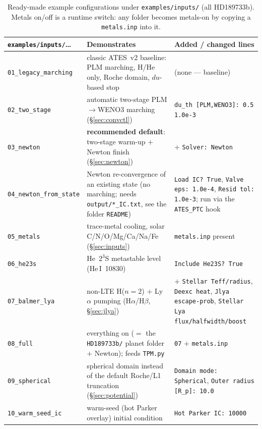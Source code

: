 \documentclass[english,a4paper]{kiseon_memo}
\begin{document}
\begin{table}[htbp]\centering\small
\begin{tabular}{@{}lp{4.6cm}p{5.6cm}@{}}
\toprule
\texttt{examples/inputs/}\ldots & Demonstrates & Added / changed lines \\
\midrule
\texttt{01\_legacy\_marching} & classic ATES~v2 baseline: PLM marching,
  H/He only, Roche domain, $du$-based stop & (none --- baseline) \\
\texttt{02\_two\_stage} & automatic two-stage PLM$\to$WENO3 marching
  (\S\ref{sec:convctl}) & \texttt{du\_th [PLM,WENO3]: 0.5 1.0e-3} \\
\texttt{03\_newton} & \textbf{recommended default}: two-stage warm-up $+$
  Newton finish (\S\ref{sec:newton}) & $+$ \texttt{Solver: Newton} \\
\texttt{04\_newton\_from\_state} & Newton re-convergence of an existing state
  (no marching; needs \texttt{output/*\_IC.txt}, see the folder
  \texttt{README}) & \texttt{Load IC? True}, \texttt{Valve eps: 1.0e-4},
  \texttt{Resid tol: 1.0e-3}; run via the \texttt{ATES\_PTC} hook \\
\texttt{05\_metals} & trace-metal cooling, solar C/N/O/Mg/Ca/Na/Fe
  (\S\ref{sec:inputs}) & \texttt{metals.inp} present \\
\texttt{06\_he23s} & He~$2^3$S metastable level (He\,I~10830) &
  \texttt{Include He23S? True} \\
\texttt{07\_balmer\_lya} & non-LTE H($n{=}2$) $+$ Ly$\alpha$ pumping
  (H$\alpha$/H$\beta$, \S\ref{sec:jlya}) & $+$ \texttt{Stellar
  Teff/radius}, \texttt{Deexc heat}, \texttt{Jlya escape-prob},
  \texttt{Stellar Lya flux/halfwidth/boost} \\
\texttt{08\_full} & everything on ($=$ the \texttt{HD189733b/} planet folder
  $+$ Newton); feeds \texttt{TPM.py} & \texttt{07} $+$ \texttt{metals.inp} \\
\texttt{09\_spherical} & spherical domain instead of the default Roche/L1
  truncation (\S\ref{sec:potential}) & \texttt{Domain mode: Spherical},
  \texttt{Outer radius [R\_p]: 10.0} \\
\texttt{10\_warm\_seed\_ic} & warm-seed (hot Parker overlay) initial
  condition & \texttt{Hot Parker IC: 10000} \\
\bottomrule
\end{tabular}
\caption{Ready-made example configurations under \texttt{examples/inputs/}
(all HD189733b). Metals on/off is a runtime switch: any folder becomes
metals-on by copying a \texttt{metals.inp} into it.}
\label{tab:exinputs}
\end{table}
\end{document}

